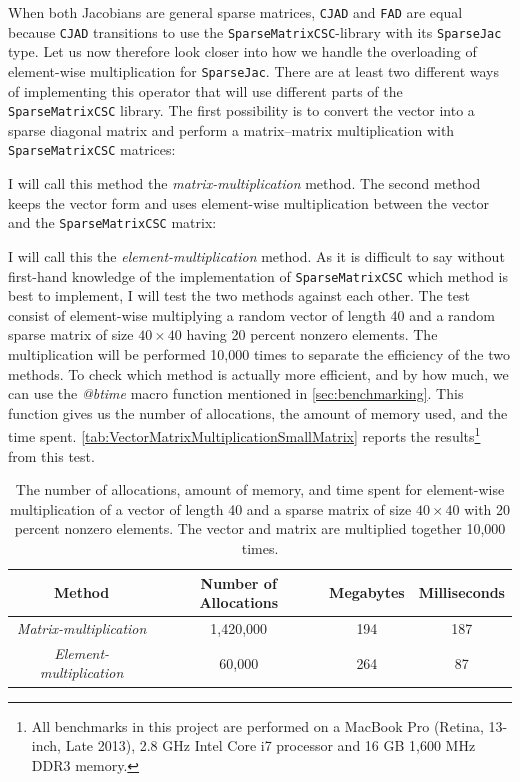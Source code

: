 When both Jacobians are general sparse matrices, \texttt{CJAD} and \texttt{FAD} are equal because \texttt{CJAD} transitions to use the \texttt{SparseMatrixCSC}-library with its \texttt{SparseJac} type. Let us now therefore look closer into how we handle the overloading of element-wise multiplication for \texttt{SparseJac}.  There are at least two different ways of implementing this operator that will use different parts of the \texttt{SparseMatrixCSC} library. The first possibility is to convert the vector into a sparse diagonal matrix and perform a matrix--matrix multiplication with \texttt{SparseMatrixCSC} matrices:

I will call this method the \textit{matrix-multiplication} method. The second method keeps the vector form and uses element-wise multiplication between the vector and the \texttt{SparseMatrixCSC} matrix:

I will call this the \textit{element-multiplication} method. As it is difficult to say without first-hand knowledge of the implementation of \texttt{SparseMatrixCSC} which method is best to implement, I will test the two methods against each other. The test consist of element-wise multiplying a random vector of length 40 and a random sparse matrix of size $40\times40$ having 20 percent nonzero elements. The multiplication will be performed 10,000 times to separate the efficiency of the two methods. To check which method is actually more efficient, and by how much, we can use the \textit{@btime} macro function mentioned in \autoref{sec:benchmarking}. This function gives us the number of allocations, the amount of memory used, and the time spent.
\autoref{tab:VectorMatrixMultiplicationSmallMatrix} reports the results\footnote{All benchmarks in this project are performed on a MacBook Pro (Retina, 13-inch, Late 2013), 2.8 GHz Intel Core i7 processor and 16 GB 1,600 MHz DDR3 memory.} from this test.
\begin{table}[H]
    \centering
    \caption{The number of allocations, amount of memory, and time spent for element-wise multiplication of a vector of length 40 and a sparse matrix of size $40\times 40$ with 20 percent nonzero elements. The vector and matrix are multiplied together 10,000 times.}
    \label{tab:VectorMatrixMultiplicationSmallMatrix}
    \def\arraystretch{1.5}
    \begin{tabular}{cccc}
    \textbf{Method} & \textbf{Number of Allocations} & \textbf{Megabytes} & \textbf{Milliseconds} \\
        \hline
         \textit{Matrix-multiplication} & 1,420,000 & 194 & 187 \\  
         \textit{Element-multiplication} & 60,000 & 264 & 87\\ 
         \hline
    \end{tabular}
\end{table}
